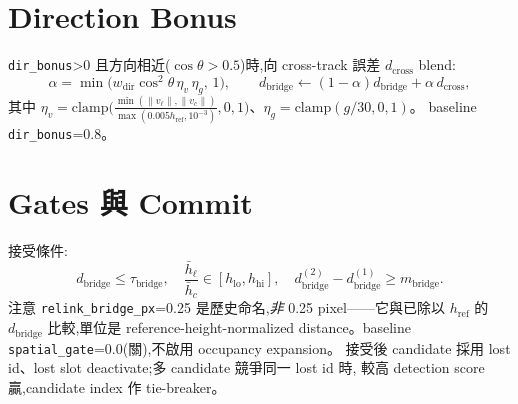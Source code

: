 \section{Direction Bonus}\label{sec:rl-dir}
\texttt{dir\_bonus}>0 且方向相近(\(\cos\theta>0.5\))時,向 cross-track 誤差 \(d_{\mathrm{cross}}\) blend:
\begin{equation}\label{eq:rl-dir}
  \alpha=\min\!\bigl(w_{\mathrm{dir}}\cos^2\theta\,\eta_v\,\eta_g,\,1\bigr),\qquad
  d_{\mathrm{bridge}}\leftarrow(1-\alpha)d_{\mathrm{bridge}}+\alpha\,d_{\mathrm{cross}},
\end{equation}
其中 \(\eta_v=\mathrm{clamp}\bigl(\tfrac{\min(\lVert v_\ell\rVert,\lVert v_c\rVert)}
{\max(0.005h_{\mathrm{ref}},10^{-3})},0,1\bigr)\)、\(\eta_g=\mathrm{clamp}(g/30,0,1)\)。
baseline \texttt{dir\_bonus}=0.8。

\section{Gates 與 Commit}\label{sec:rl-gate}
接受條件:
\begin{equation}\label{eq:rl-gate}
  d_{\mathrm{bridge}}\le\tau_{\mathrm{bridge}},\quad
  \frac{\bar{h}_\ell}{\bar{h}_c}\in[h_{\mathrm{lo}},h_{\mathrm{hi}}],\quad
  d^{(2)}_{\mathrm{bridge}}-d^{(1)}_{\mathrm{bridge}}\ge m_{\mathrm{bridge}}.
\end{equation}
注意 \texttt{relink\_bridge\_px}=0.25 是歷史命名,\emph{非} 0.25 pixel——它與已除以
\(h_{\mathrm{ref}}\) 的 \(d_{\mathrm{bridge}}\) 比較,單位是 reference-height-normalized
distance。baseline \texttt{spatial\_gate}=0.0(關),不啟用 occupancy expansion。
接受後 candidate 採用 lost id、lost slot deactivate;多 candidate 競爭同一 lost id 時,
較高 detection score 贏,candidate index 作 tie-breaker。

